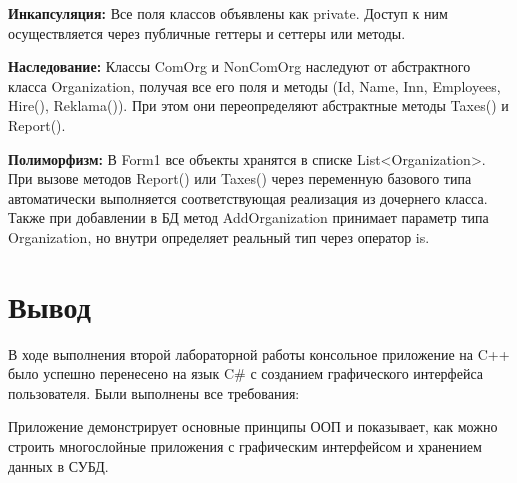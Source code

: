 \documentclass[oneside,a4paper,14pt]{extarticle}
\begin{document}
\textbf{Инкапсуляция:}
Все поля классов объявлены как private. Доступ к ним осуществляется через публичные геттеры и сеттеры или методы.

\textbf{Наследование:}
Классы ComOrg и NonComOrg наследуют от абстрактного класса Organization, получая все его поля и методы (Id,  Name, Inn, Employees, Hire(), Reklama()). При этом они переопределяют абстрактные методы Taxes() и Report().

\textbf{Полиморфизм:}
В Form1 все объекты хранятся в списке List<Organization>. При вызове методов Report() или Taxes() через переменную базового типа автоматически выполняется соответствующая реализация из дочернего класса. Также при добавлении в БД метод AddOrganization принимает параметр типа Organization, но внутри определяет реальный тип через оператор is.

\section*{Вывод}

В ходе выполнения второй лабораторной работы консольное приложение на C++ было успешно перенесено на язык C\# с созданием графического интерфейса пользователя. Были выполнены все требования:

Приложение демонстрирует основные принципы ООП и показывает, как можно строить многослойные приложения с графическим интерфейсом и хранением данных в СУБД.
\end{document}
